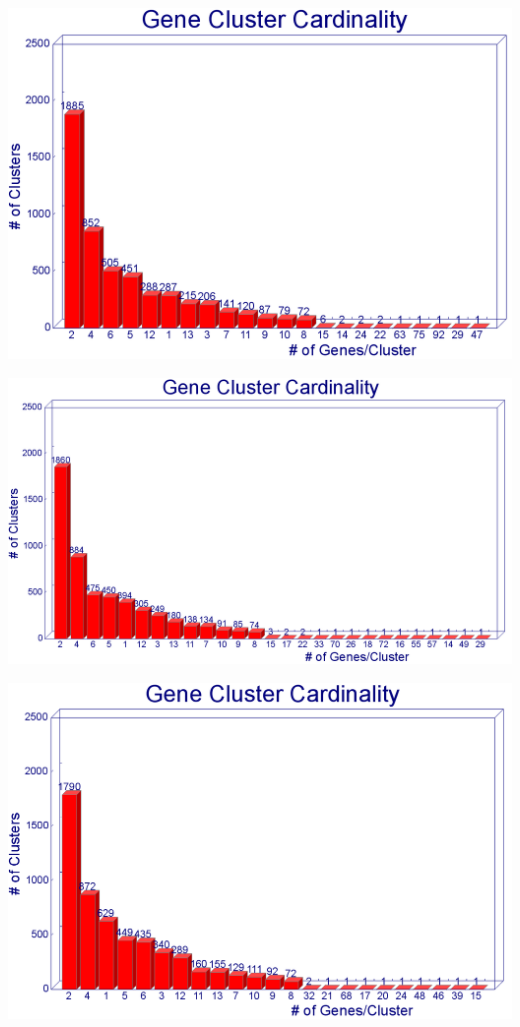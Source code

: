 \documentclass[11pt,notitlepage]{article}
\begin{document}
  \includegraphics[width=145mm]{i90_a50_graph.png}
  
  \includegraphics[width=145mm]{i90_a70_graph.png}
  
  \includegraphics[width=145mm]{i90_a90_graph.png}
\end{document}
